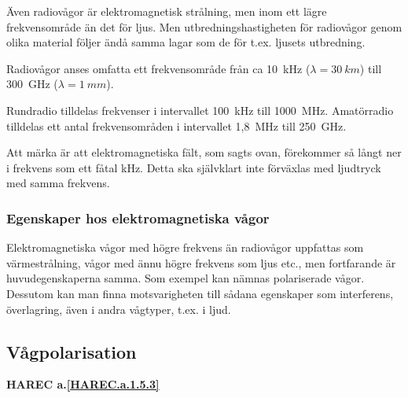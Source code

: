 Även radiovågor är elektromagnetisk strålning, men inom ett lägre
frekvensområde än det för ljus. Men utbredningshastigheten för radiovågor genom
olika material följer ändå samma lagar som de för t.ex. ljusets utbredning.

Radiovågor anses omfatta ett frekvensområde från ca 10~kHz
(\(\lambda = 30\ km\)) till 300~GHz (\(\lambda = 1\ mm\)).

Rundradio tilldelas frekvenser i intervallet 100~kHz till 1000~MHz.
Amatörradio tilldelas ett antal frekvensområden i intervallet 1,8~MHz till
250~GHz.

Att märka är att elektromagnetiska fält, som sagts ovan, förekommer så långt
ner i frekvens som ett fåtal kHz. Detta ska självklart inte förväxlas med
ljudtryck med samma frekvens.

\subsubsection{Egenskaper hos elektromagnetiska vågor}

Elektromagnetiska vågor med högre frekvens än radiovågor uppfattas som
värmestrålning, vågor med ännu högre frekvens som ljus etc., men fortfarande är
huvudegenskaperna samma. Som exempel kan nämnas polariserade vågor. Dessutom
kan man finna motsvarigheten till sådana egenskaper som interferens,
överlagring, även i andra vågtyper, t.ex. i ljud.

\subsection{Vågpolarisation}
\textbf{HAREC a.\ref{HAREC.a.1.5.3}\label{myHAREC.a.1.5.3}}
\label{vågpolarisation}

